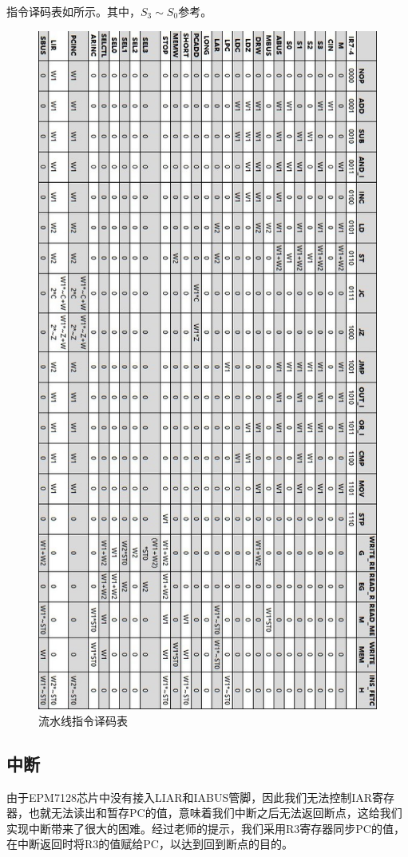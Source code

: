 \documentclass[lang=cn,11pt,a4paper,cite=authornum]{paper}
\begin{document}
指令译码表如所示。其中，$S_3\sim S_0$参考。

\begin{figure}[htbp]
    \centering
    \includegraphics[width=0.75\linewidth]{./Images/pipe-code-table.jpg}
    \caption{流水线指令译码表\label{fig:pipe-code-table}}
\end{figure}

\subsection{中断}

由于EPM7128芯片中没有接入LIAR和IABUS管脚，因此我们无法控制IAR寄存器，也就无法读出和暂存PC的值，意味着我们中断之后无法返回断点，这给我们实现中断带来了很大的困难。经过老师的提示，我们采用R3寄存器同步PC的值，在中断返回时将R3的值赋给PC，以达到回到断点的目的。
\end{document}

